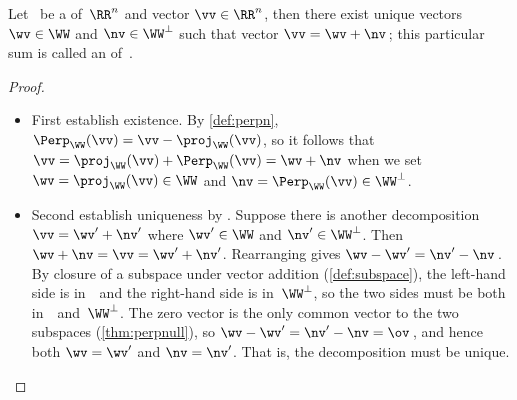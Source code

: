 \begin{reduce}
\begin{theorem} \label{thm:odt}
Let \WW\ be a  of~\(\RR^n\) and vector \(\vv\in\RR^n\), then there exist unique vectors \(\wv\in\WW\) and \(\nv\in\WW^\perp\) such that vector \(\vv=\wv+\nv\)\,; this particular sum is called an  of~\vv.
\end{theorem}

\begin{proof} 
\begin{itemize}
\item First establish existence.  
By \cref{def:perpn}, \(\Perp_\WW(\vv)=\vv-\proj_\WW(\vv)\), so it follows that \(\vv=\proj_\WW(\vv)+\Perp_\WW(\vv)=\wv+\nv\) when we set \(\wv=\proj_\WW(\vv)\in\WW\) and \(\nv=\Perp_\WW(\vv)\in\WW^\perp\).

\item Second establish uniqueness by .
Suppose there is another decomposition \(\vv=\wv'+\nv'\) where \(\wv'\in\WW\) and \(\nv'\in\WW^\perp\).
Then \(\wv+\nv=\vv=\wv'+\nv'\).
Rearranging gives \(\wv-\wv'=\nv'-\nv\)\,.
By closure of a subspace under vector addition (\cref{def:subspace}), the left-hand side is in~\WW\ and the right-hand side is in~\(\WW^\perp\), so the two sides must be both in~\WW\ and~\(\WW^\perp\).
The zero vector is the only common vector to the two subspaces (\cref{thm:perpnull}), so \(\wv-\wv'=\nv'-\nv=\ov\)\,, and hence both \(\wv=\wv'\) and \(\nv=\nv'\).
That is, the decomposition must be unique.
\end{itemize}
\end{proof}


\end{reduce}
\newcommand{\projxv}[9]{\begin{tikzpicture}
  \begin{axis}[footnotesize
  ,axis equal ,axis x line=none , axis y line=none
  ,samples=2 ]
  \addplot[black,mark=*]coordinates {(0,0)};
  \addplot[red,quiver={u=#1,v=#2},-stealth]coordinates {(0,0)};
  \node[right] at (axis cs:#1,#2) {$\vec #9$};
  \addplot[blue,quiver={u=#3,v=#4},-stealth]coordinates {(0,0)};
  \node[right] at (axis cs:#3,#4) {$\vec #8$};
  \ifnum#7>0
  \addplot[black] coordinates {(#5/2,#6/2)} node {proj};
  \addplot[brown,thick,quiver={u=#5,v=#6},-stealth]coordinates {(0,0)};
  \addplot[black] coordinates {(#1/2+#5/2,#2/2+#6/2)} node {perp};
  \addplot[brown,thick,quiver={u=#1-#5,v=#2-#6},-stealth]coordinates {(#5,#6)};
  \fi
  \end{axis}
\end{tikzpicture}}
